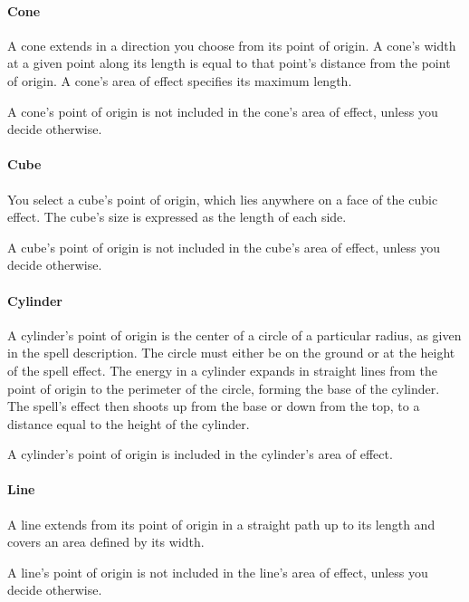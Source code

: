 \documentclass[
]{article}
\begin{document}
\hypertarget{cone}{%
\paragraph{Cone}\label{cone}}

A cone extends in a direction you choose from its point of origin. A
cone's width at a given point along its length is equal to that point's
distance from the point of origin. A cone's area of effect specifies its
maximum length.

A cone's point of origin is not included in the cone's area of effect,
unless you decide otherwise.

\hypertarget{cube}{%
\paragraph{Cube}\label{cube}}

You select a cube's point of origin, which lies anywhere on a face of
the cubic effect. The cube's size is expressed as the length of each
side.

A cube's point of origin is not included in the cube's area of effect,
unless you decide otherwise.

\hypertarget{cylinder}{%
\paragraph{Cylinder}\label{cylinder}}

A cylinder's point of origin is the center of a circle of a particular
radius, as given in the spell description. The circle must either be on
the ground or at the height of the spell effect. The energy in a
cylinder expands in straight lines from the point of origin to the
perimeter of the circle, forming the base of the cylinder. The spell's
effect then shoots up from the base or down from the top, to a distance
equal to the height of the cylinder.

A cylinder's point of origin is included in the cylinder's area of
effect.

\hypertarget{line}{%
\paragraph{Line}\label{line}}

A line extends from its point of origin in a straight path up to its
length and covers an area defined by its width.

A line's point of origin is not included in the line's area of effect,
unless you decide otherwise.
\end{document}
